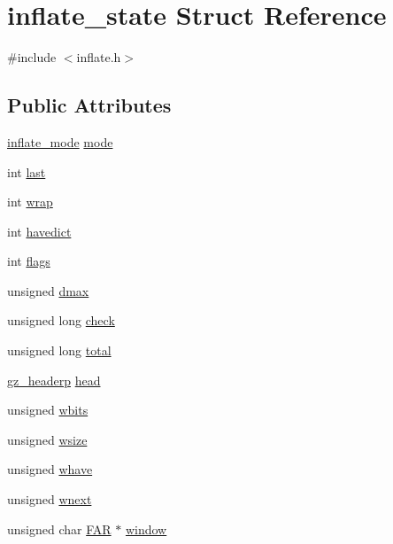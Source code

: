 \hypertarget{structinflate__state}{}\section{inflate\+\_\+state Struct Reference}
\label{structinflate__state}


{\ttfamily \#include $<$inflate.\+h$>$}

\subsection*{Public Attributes}
\begin{DoxyCompactItemize}
\item 
\hyperlink{inflate_8h_a164ea0159d5f0b5f12a646f25f99ecea}{inflate\+\_\+mode} \hyperlink{structinflate__state_a9c7906fee7eeeb450b13576531ca639d}{mode}
\item 
int \hyperlink{structinflate__state_ab3cbcd2c5ff3b0b8b34ef402a13afdf7}{last}
\item 
int \hyperlink{structinflate__state_a990d157b5c0d4ba178c3361de9ce6561}{wrap}
\item 
int \hyperlink{structinflate__state_a2eb1cd634ed6baade952ffa5938ebcdc}{havedict}
\item 
int \hyperlink{structinflate__state_a9dcf6151443750d75b2283d0a3e62c39}{flags}
\item 
unsigned \hyperlink{structinflate__state_ae3d433011714e673b22e82156acc4416}{dmax}
\item 
unsigned long \hyperlink{structinflate__state_ae597e4f5c37b9f7881015384bf826371}{check}
\item 
unsigned long \hyperlink{structinflate__state_af9d1071eb75b1ee37a151ccec8dfee95}{total}
\item 
\hyperlink{zlib_8h_a40e9dcc294796d99b25e98fb06477fc8}{gz\+\_\+headerp} \hyperlink{structinflate__state_aac35b33a559009eb4bc0e2bdd8e9b5c6}{head}
\item 
unsigned \hyperlink{structinflate__state_a71f844b589ac450f17d69f3692a8c5cc}{wbits}
\item 
unsigned \hyperlink{structinflate__state_acca16ca86216760eaf307bf71e15e470}{wsize}
\item 
unsigned \hyperlink{structinflate__state_a6b56aabe80412784eadc1068981c9d00}{whave}
\item 
unsigned \hyperlink{structinflate__state_a1c3ec583646b68713e5c92151064a6dd}{wnext}
\item 
unsigned char \hyperlink{zconf_8h_aef060b3456fdcc093a7210a762d5f2ed}{F\+AR} $\ast$ \hyperlink{structinflate__state_a9cc4c0bde426383731394dcf91c40673}{window}

\end{DoxyCompactItemize}
